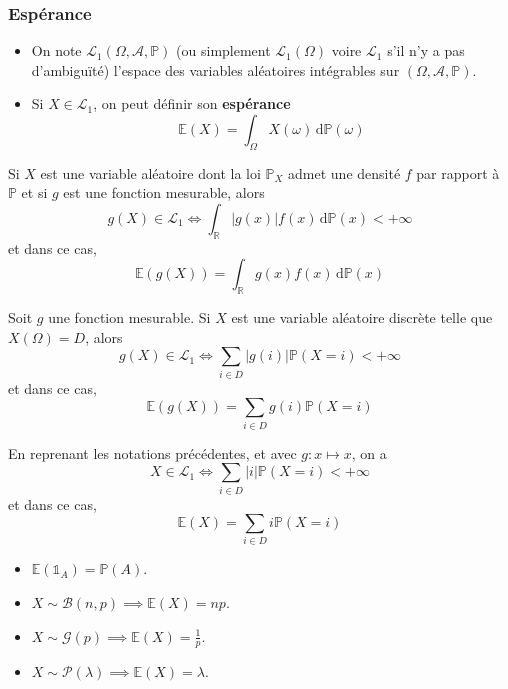   \subsubsection{Espérance}


  \begin{definition}
    \begin{itemize}
      \item On note $\mathcal{L}_1(\Omega, \mathcal{A}, \mathbb{P})$ (ou simplement $\mathcal{L}_1(\Omega)$ voire $\mathcal{L}_1$ s'il n'y a pas d'ambiguïté) l'espace des variables aléatoires intégrables sur $(\Omega, \mathcal{A}, \mathbb{P})$.
      \item Si $X \in \mathcal{L}_1$, on peut définir son \textbf{espérance}
      \[ \mathbb{E}(X) = \int_\Omega X(\omega) \, \mathrm{d}\mathbb{P}(\omega) \]
    \end{itemize}
  \end{definition}


  \begin{theorem}
    Si $X$ est une variable aléatoire dont la loi $\mathbb{P}_X$ admet une densité $f$ par rapport à $\mathbb{P}$ et si $g$ est une fonction mesurable, alors
    \[ g(X) \in \mathcal{L}_1 \iff \int_{\mathbb{R}} \vert g(x) \vert f(x) \, \mathrm{d}\mathbb{P}(x) < +\infty \]
    et dans ce cas,
    \[ \mathbb{E}(g(X)) = \int_{\mathbb{R}} g(x) f(x) \, \mathrm{d}\mathbb{P}(x) \]
  \end{theorem}

  \begin{corollary}
    Soit $g$ une fonction mesurable. Si $X$ est une variable aléatoire discrète telle que $X(\Omega) = D$, alors
    \[ g(X) \in \mathcal{L}_1 \iff \sum_{i \in D} \vert g(i) \vert \mathbb{P}(X = i) < +\infty \]
    et dans ce cas,
    \[ \mathbb{E}(g(X)) = \sum_{i \in D} g(i) \mathbb{P}(X = i) \]
  \end{corollary}

  \begin{remark}
    En reprenant les notations précédentes, et avec $g : x \mapsto x$, on a
    \[ X \in \mathcal{L}_1 \iff \sum_{i \in D} \vert i \vert \mathbb{P}(X = i) < +\infty \]
    et dans ce cas,
    \[ \mathbb{E}(X) = \sum_{i \in D} i \mathbb{P}(X = i) \]
  \end{remark}


  \begin{example}
    \begin{itemize}
      \item $\mathbb{E}(\mathbb{1}_A) = \mathbb{P}(A)$.
      \item $X \sim \mathcal{B}(n, p) \implies \mathbb{E}(X) = np$.
      \item $X \sim \mathcal{G}(p) \implies \mathbb{E}(X) = \frac{1}{p}$.
      \item $X \sim \mathcal{P}(\lambda) \implies \mathbb{E}(X) = \lambda$.
    \end{itemize}
  \end{example}

